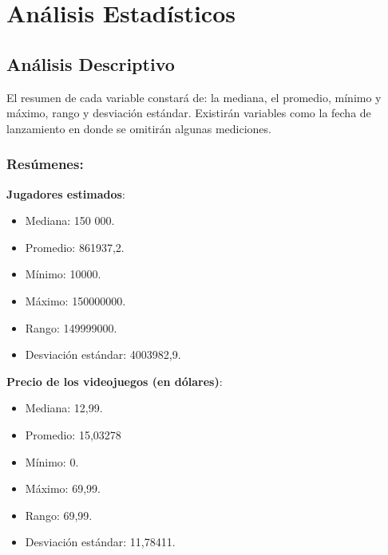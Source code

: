 \documentclass[
  letterpaper,
  DIV=11,
  numbers=noendperiod]{scrreprt}
\begin{document}

\chapter{Análisis Estadísticos}\label{anuxe1lisis-estaduxedsticos}

\section{Análisis Descriptivo}\label{anuxe1lisis-descriptivo}

El resumen de cada variable constará de: la mediana, el promedio, mínimo
y máximo, rango y desviación estándar. Existirán variables como la fecha
de lanzamiento en donde se omitirán algunas mediciones.

\subsection{Resúmenes:}\label{resuxfamenes}

\begin{tcolorbox}[enhanced jigsaw, toprule=.15mm, rightrule=.15mm, colframe=quarto-callout-color-frame, colback=white, left=2mm, breakable, arc=.35mm, opacityback=0, bottomrule=.15mm, leftrule=.75mm]

\textbf{Jugadores estimados}:

\begin{itemize}
\item
  Mediana: 150 000.
\item
  Promedio: 861937,2.
\item
  Mínimo: 10000.
\item
  Máximo: 150000000.
\item
  Rango: 149999000.
\item
  Desviación estándar: 4003982,9.
\end{itemize}

\end{tcolorbox}

\begin{tcolorbox}[enhanced jigsaw, toprule=.15mm, rightrule=.15mm, colframe=quarto-callout-color-frame, colback=white, left=2mm, breakable, arc=.35mm, opacityback=0, bottomrule=.15mm, leftrule=.75mm]

\textbf{Precio de los videojuegos (en dólares)}:

\begin{itemize}
\item
  Mediana: 12,99.
\item
  Promedio: 15,03278
\item
  Mínimo: 0.
\item
  Máximo: 69,99.
\item
  Rango: 69,99.
\item
  Desviación estándar: 11,78411.
\end{itemize}

\end{tcolorbox}
\end{document}
